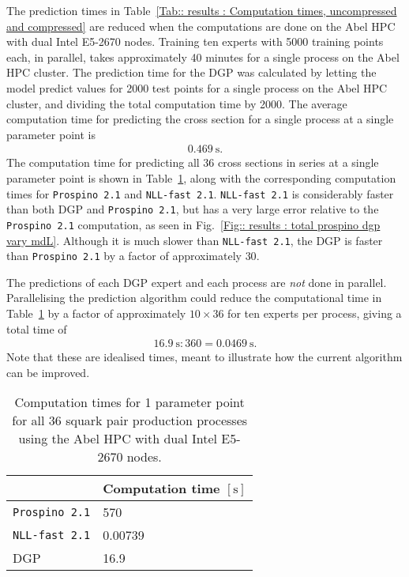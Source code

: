 \documentclass[twoside,english]{uiofysmaster}
\begin{document}
{{The prediction times in Table~\ref{Tab:: results : Computation times, uncompressed and compressed} are reduced when the computations are done on the Abel HPC with dual Intel E5-2670 nodes. Training ten experts with 5000 training points each, in parallel, takes approximately 40 minutes for a single process on the Abel HPC cluster. The prediction time for the DGP was calculated by letting the model predict values for 2000 test points for a  single process on the Abel HPC cluster, and dividing the total computation time by 2000. The average computation time for predicting the cross section for a single process at a single parameter point is
\begin{align*}
0.469~\mathrm{s}.
\end{align*}
The computation time for predicting all 36 cross sections in series at a single parameter point is shown in Table~\ref{Tab :: results : Computation times}, along with the corresponding computation times for \verb|Prospino 2.1| and  \verb|NLL-fast 2.1|. \verb|NLL-fast 2.1| is considerably faster than both DGP and \verb|Prospino 2.1|, but has a very large error relative to the \verb|Prospino 2.1| computation, as seen in Fig.~\ref{Fig:: results : total prospino dgp vary mdL}. Although it is much slower than \verb|NLL-fast 2.1|, the DGP is faster than \verb|Prospino 2.1| by a factor of approximately $30$.

The predictions of each DGP expert and each process are \textit{not} done in parallel. Parallelising the prediction algorithm could reduce the computational time in Table~\ref{Tab :: results : Computation times} by a factor of approximately $10 \times 36$ for ten experts per process, giving a total time of
\begin{align*}
16.9~\mathrm{s} : 360 = 0.0469~\mathrm{s}.
\end{align*}
Note that these are idealised times, meant to illustrate how the current algorithm can be improved. 

\begin{table}
\centering
\begin{tabular}{@{}ll@{}} \toprule
 & Computation time $[\mathrm{s}]$\\ \midrule
{\tt Prospino 2.1} & 570 \\
{\tt NLL-fast 2.1} & 0.00739\\
DGP & 16.9\\
\bottomrule
\end{tabular}
\caption{Computation times for 1 parameter point for all 36 squark pair production processes using the Abel HPC with dual Intel E5-2670 nodes.}
\label{Tab :: results : Computation times}
\end{table}








}}
\end{document}
